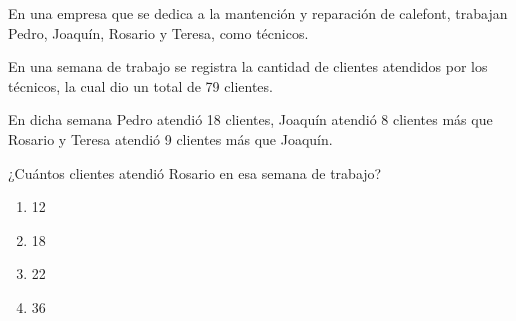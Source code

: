 \begin{problem}
    En una empresa que se dedica a la mantención y reparación de calefont, trabajan Pedro, Joaquín, Rosario y Teresa, como técnicos.

    En una semana de trabajo se registra la cantidad de clientes atendidos por los técnicos, la cual dio un total de 79 clientes.

    En dicha semana Pedro atendió 18 clientes, Joaquín atendió 8 clientes más que Rosario y Teresa atendió 9 clientes más que Joaquín.

    ¿Cuántos clientes atendió Rosario en esa semana de trabajo?

    \begin{enumerate}[label=\Alph*.]
        \item 12
        \item 18
        \item 22
        \item 36
    \end{enumerate}
\end{problem}
